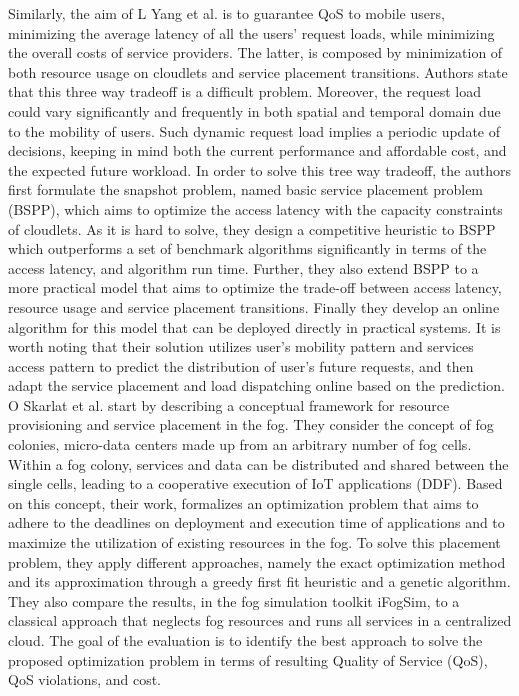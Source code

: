 \noindent\tab Similarly, the aim of L Yang et al. \cite{yang2016cost} is to guarantee QoS to mobile users, minimizing the average latency of all the users’ request loads, while minimizing the overall costs of service providers. The latter, is composed by minimization of both resource usage on cloudlets and service placement transitions. Authors state that this three way tradeoff is a difficult problem. Moreover, the request load could vary significantly and frequently in both spatial and temporal domain due to the mobility of users. Such dynamic request load implies a periodic update of decisions, keeping in mind both the current performance and affordable cost, and the expected future workload. In order to solve this tree way tradeoff, the authors first formulate the snapshot problem, named basic service placement problem (BSPP), which aims to optimize the access latency with the capacity constraints of cloudlets. As it is hard to solve, they design a competitive heuristic to BSPP which outperforms a set of benchmark algorithms significantly in terms of the access latency, and algorithm run time. Further, they also extend BSPP to a more practical model that aims to optimize the trade-off between access latency, resource usage and service placement transitions. Finally they develop an online algorithm for this model that can be deployed directly in practical systems. It is worth noting that their solution utilizes user’s mobility pattern and services access pattern to predict the distribution of user’s future requests, and then adapt the service placement and load dispatching online based on the prediction.\\
\noindent\tab O Skarlat et al. \cite{skarlat2017optimized} start by describing a conceptual framework for resource provisioning and service placement in the fog. They consider the concept of fog colonies, micro-data centers made up from an arbitrary number of fog cells. Within a fog colony, services and data can be distributed and shared between the single cells, leading to a cooperative execution of IoT applications (DDF). Based on this concept, their work, formalizes an optimization problem that aims to adhere to the deadlines on deployment and execution time of applications and to maximize the utilization of existing resources in the fog. To solve this placement problem, they apply different approaches, namely the exact optimization method and its approximation through a greedy first fit heuristic and a genetic algorithm. They also compare the results, in the fog simulation toolkit iFogSim, to a classical approach that neglects fog resources and runs all services in a centralized cloud. The goal of the evaluation is to identify the best approach to solve the proposed optimization problem in terms of resulting Quality of Service (QoS), QoS violations, and cost.\\
